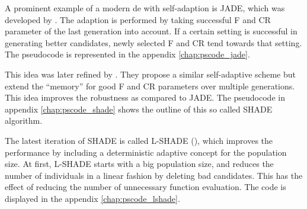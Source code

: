 \documentclass[./\jobname.tex]{subfiles}
\begin{document}
A prominent example of a modern \gls{de} with self-adaption is JADE, which was developed by \cite{zhang_jade_2009}. The adaption is performed by taking successful F and CR parameter of the last generation into account. If a certain setting is successful in generating better candidates, newly selected F and CR tend towards that setting. The pseudocode is represented in the appendix \ref{chap:pscode_jade}. 

This idea was later refined by \cite{tanabe_success-history_2013}. They propose a similar self-adaptive scheme but extend the ``memory'' for good F and CR parameters over multiple generations. This idea improves the robustness as compared to JADE. The pseudocode in appendix \ref{chap:pscode_shade} shows the outline of this so called SHADE algorithm. 

The latest iteration of SHADE is called L-SHADE (\cite{tanabe_improving_2014}), which improves the performance by including a deterministic adaptive concept for the population size. At first, L-SHADE starts with a big population size, and reduces the number of individuals in a linear fashion by deleting bad candidates. This has the effect of reducing the number of unnecessary function evaluation. The code is displayed in the appendix \ref{chap:pscode_lshade}. 
\end{document}
